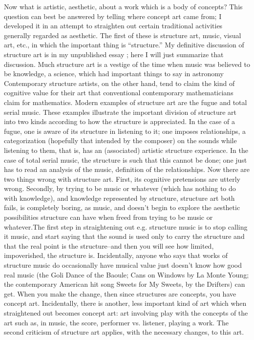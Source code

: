 Now what is artistic, aesthetic, about a work which is a body of 
concepts? This question can best be answered by telling where concept art 
came from; I developed it in an attempt to straighten out certain traditional 
activities generally regarded as aesthetic. The first of these is structure art, 
music, visual art, etc., in which the important thing is \enquote{structure.} My 
definitive discussion of structure art is in my unpublished essay ; here I will just summarize that discussion. Much 
structure art is a vestige of the time when \eg music was believed to be 
knowledge, a science, which had important things to say in astronomy \etc
Contemporary structure artists, on the other hand, tend to claim the kind of 
cognitive value for their art that conventional contemporary mathematicians 
claim for mathematics. Modern examples of structure art are the fugue and 
total serial music. These examples illustrate the important division of 
structure art into two kinds according to how the structure is appreciated. In 
the case of a fugue, one is aware of its structure in listening to it; one 
imposes relationships, a categorization (hopefully that intended by the 
composer) on the sounds while listening to them, that is, has an (associated) 
artistic structure experience. In the case of total serial music, the structure is 
such that this cannot be done; one just has to read an analysis of the 
music, definition of the relationships. Now there are two things wrong with 
structure art. First, its cognitive pretensions are utterly wrong. Secondly, by 
trying to be music or whatever (which has nothing to do with knowledge), 
and knowledge represented by structure, structure art both fails, is 
completely boring, as music, and doesn't begin to explore the aesthetic 
possibilities structure can have when freed from trying to be music or 
whatever.The first step in straightening out e.g. structure music is to stop 
calling it music, and start saying that the sound is used only to carry the 
structure and that the real point is the structure--and then you will see how 
limited, impoverished, the structure is. Incidentally, anyone who says that 
works of structure music do occasionally have musical value just doesn't 
know how good real music (the Goli Dance of the Baoule; Cans on Windows 
by La Monte Young; the contemporary American hit song Sweets for My 
Sweets, by the Drifters) can get. When you make the change, then since 
structures are concepts, you have concept art. Incidentally, there is another, 
less important kind of art which when straightened out becomes concept art: 
art involving play with the concepts of the art such as, in music, the score, 
performer vs. listener, playing a work. The second criticism of structure art 
applies, with the necessary changes, to this art. 

